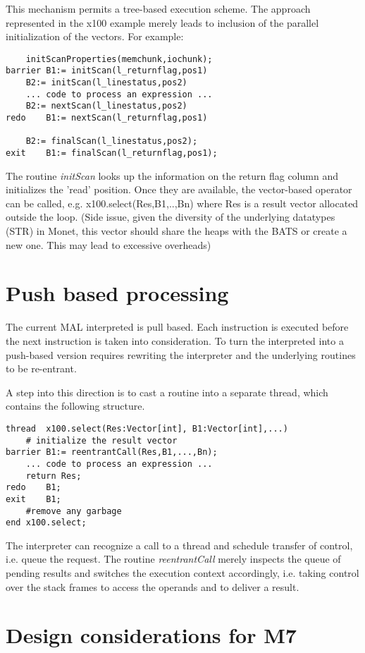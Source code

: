 \documentclass[10pt,twocolumn,fleqn]{article}
\begin{document}
This mechanism permits a tree-based execution scheme. The approach represented
in the x100 example merely leads to inclusion of the parallel initialization
of the vectors. For example:
\begin{verbatim}
	initScanProperties(memchunk,iochunk);
barrier B1:= initScan(l_returnflag,pos1)
	B2:= initScan(l_linestatus,pos2)
	... code to process an expression ...
	B2:= nextScan(l_linestatus,pos2)
redo	B1:= nextScan(l_returnflag,pos1)

	B2:= finalScan(l_linestatus,pos2);
exit	B1:= finalScan(l_returnflag,pos1);
\end{verbatim}

The routine {\em initScan} looks up the information on the return flag
column and initializes the 'read' position.
Once they are available, the vector-based operator can be called, e.g.
x100.select(Res,B1,..,Bn) where Res is a result vector allocated outside
the loop. (Side issue, given the diversity of the underlying datatypes (STR) in
Monet, this vector should share the heaps with the BATS or create
a new one. This may lead to excessive overheads)

\section{Push based processing}
The current MAL interpreted is pull based. Each instruction is executed before
the next instruction is taken into consideration. To turn the interpreted into
a push-based version requires rewriting the interpreter and the
underlying routines to be re-entrant.

A step into this direction is to cast a routine into a separate thread, which
contains the following structure.
\begin{verbatim}
thread  x100.select(Res:Vector[int], B1:Vector[int],...)
	# initialize the result vector
barrier B1:= reentrantCall(Res,B1,...,Bn);
	... code to process an expression ...
	return Res;
redo	B1;
exit	B1;
	#remove any garbage
end	x100.select;
\end{verbatim}
The interpreter can recognize a call to a thread and schedule transfer
of control, i.e. queue the request. The routine {\em reentrantCall} merely
inspects the queue of pending results and switches the execution context
accordingly, i.e. taking control over the stack frames to access the
operands and to deliver a result.


\section{Design considerations for M7}
\end{document}

